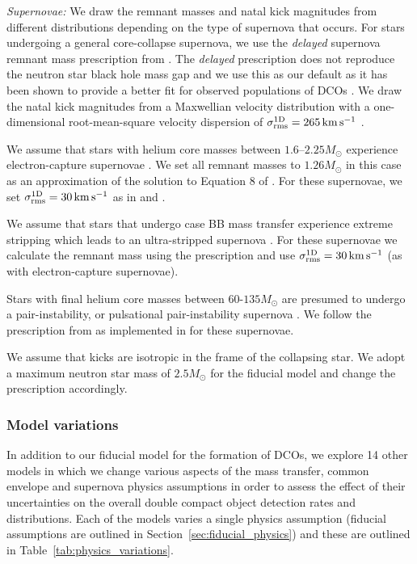 \textit{Supernovae:} We draw the remnant masses and natal kick magnitudes from different distributions depending on the type of supernova that occurs. For stars undergoing a general core-collapse supernova, we use the \textit{delayed} supernova remnant mass prescription from \citet{Fryer+2012}. The \textit{delayed} prescription does not reproduce the neutron star black hole mass gap and we use this as our default as it has been shown to provide a better fit for observed populations of DCOs \citep[e.g.][]{Vigna-Gomez+2018}. We draw the natal kick magnitudes from a Maxwellian velocity distribution with a one-dimensional root-mean-square velocity dispersion of $\sigma_{\rm rms}^{\rm 1D} = 265 \unit{km}{s^{-1}}$ \citep{Lyne+1994, Hobbs+2005}.

We assume that stars with helium core masses between $1.6$--$2.25 \unit{M_{\odot}}$ \citep{Hurley+2002} experience electron-capture supernovae \citep{Nomoto+1984, Nomoto+1987, Ivanova+2008}. We set all remnant masses to $1.26 \unit{M_{\odot}}$ in this case as an approximation of the solution to Equation 8 of \citet{Timmes+1996}. For these supernovae, we set $\sigma_{\rm rms}^{\rm 1D} = 30 \unit{km}{s^{-1}}$ as in \citet{Pfahl+2002} and \citet{Podsiadlowski+2004}.

We assume that stars that undergo case BB mass transfer \citep{Dewi+2002} experience extreme stripping which leads to an ultra-stripped supernova \citep{Tauris+2013, Tauris+2015}. For these supernovae we calculate the remnant mass using the \citet{Fryer+2012} prescription and use $\sigma_{\rm rms}^{\rm 1D} = 30 \unit{km}{s^{-1}}$ (as with electron-capture supernovae).

Stars with final helium core masses between $60$-$135 \unit{M_{\odot}}$ are presumed to undergo a pair-instability, or pulsational pair-instability supernova \citep[e.g.][]{Woosley+2007, Farmer+2019}. We follow the prescription from \citet{Marchant+2019} as implemented in \citep{Stevenson+2019} for these supernovae.

We assume that kicks are isotropic in the frame of the collapsing star. We adopt a maximum neutron star mass of $2.5 \unit{M_{\odot}}$ \citep[e.g.][]{Kalogera+1996, Fryer+2015, Margalit+2017} for the fiducial model and change the \citet{Fryer+2012} prescription accordingly.

\subsubsection{Model variations} \label{sec:variation_assumptions}
In addition to our fiducial model for the formation of DCOs, we explore 14 other models in which we change various aspects of the mass transfer, common envelope and supernova physics assumptions in order to assess the effect of their uncertainties on the overall double compact object detection rates and distributions. Each of the models varies a single physics assumption (fiducial assumptions are outlined in Section~\ref{sec:fiducial_physics}) and these are outlined in Table~\ref{tab:physics_variations}.

